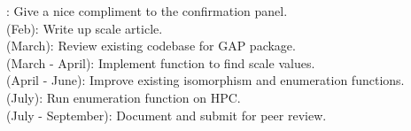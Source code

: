 \documentclass[preview]{standalone}
\begin{document}
: Give a nice compliment to the confirmation panel.\\(Feb): Write up scale article.\\(March): Review existing codebase for GAP package.\\(March - April): Implement function to find scale values.\\(April - June): Improve existing isomorphism and enumeration functions.\\(July): Run enumeration function on HPC.\\(July - September): Document and submit for peer review.\\
\end{document}
